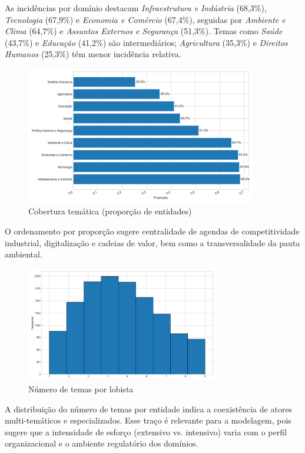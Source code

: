 As incidências por domínio destacam \textit{Infraestrutura e Indústria} (68,3\%), \textit{Tecnologia} (67,9\%) e \textit{Economia e Comércio} (67,4\%), seguidas por \textit{Ambiente e Clima} (64,7\%) e \textit{Assuntos Externos e Segurança} (51,3\%). Temas como \textit{Saúde} (43,7\%) e \textit{Educação} (41,2\%) são intermediários; \textit{Agricultura} (35,3\%) e \textit{Direitos Humanos} (25,3\%) têm menor incidência relativa.

\begin{figure}[!htbp]
\centering
\includegraphics[width=0.9\textwidth]{figures/theme_coverage.png}
\caption{Cobertura temática (proporção de entidades)}
\end{figure}

O ordenamento por proporção sugere centralidade de agendas de competitividade industrial, digitalização e cadeias de valor, bem como a transversalidade da pauta ambiental.


\begin{figure}[!htbp]
\centering
\includegraphics[width=0.75\textwidth]{figures/themes_per_lobbyist_hist.png}
\caption{Número de temas por lobista}
\end{figure}

A distribuição do número de temas por entidade indica a coexistência de atores multi-temáticos e especializados. Esse traço é relevante para a modelagem, pois sugere que a intensidade de esforço (extensivo vs. intensivo) varia com o perfil organizacional e o ambiente regulatório dos domínios.


